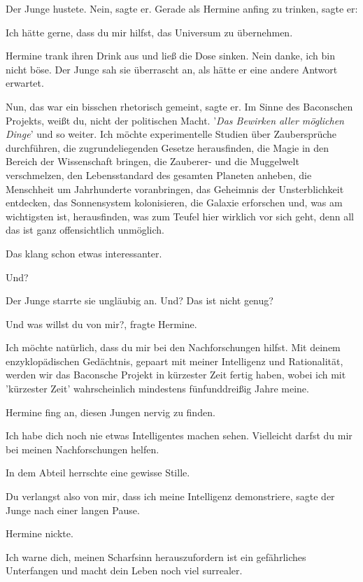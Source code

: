 Der Junge hustete. \glqq{}Nein\grqq{}, sagte er. Gerade als Hermine anfing zu
trinken, sagte er:

\glqq{}Ich hätte gerne, dass du mir hilfst, das Universum zu übernehmen.\grqq{}

Hermine trank ihren Drink aus und ließ die Dose sinken. \glqq{}Nein danke, ich
bin nicht böse.\grqq{} Der Junge sah sie überrascht an, als hätte er eine andere
Antwort erwartet.

\glqq{}Nun, das war ein bisschen rhetorisch gemeint\grqq{}, sagte er. \glqq{}Im
Sinne des Baconschen Projekts, weißt du, nicht der politischen Macht. '\emph{Das
Bewirken aller möglichen Dinge}' und so weiter. Ich möchte experimentelle
Studien über Zaubersprüche durchführen, die zugrundeliegenden Gesetze
herausfinden, die Magie in den Bereich der Wissenschaft bringen, die Zauberer-
und die Muggelwelt verschmelzen, den Lebensstandard des gesamten Planeten
anheben, die Menschheit um Jahrhunderte voranbringen, das Geheimnis der
Unsterblichkeit entdecken, das Sonnensystem kolonisieren, die Galaxie erforschen
und, was am wichtigsten ist, herausfinden, was zum Teufel hier wirklich vor sich
geht, denn all das ist ganz offensichtlich unmöglich.\grqq{}

Das klang schon etwas interessanter.

\glqq{}Und?\grqq{}

Der Junge starrte sie ungläubig an. \glqq{}Und? Das ist nicht genug?\grqq{}

\glqq{}Und was willst du von mir?\grqq{}, fragte Hermine.

\glqq{}Ich möchte natürlich, dass du mir bei den Nachforschungen hilfst. Mit
deinem enzyklopädischen Gedächtnis, gepaart mit meiner Intelligenz und
Rationalität, werden wir das Baconsche Projekt in kürzester Zeit fertig haben,
wobei ich mit 'kürzester Zeit' wahrscheinlich mindestens fünfunddreißig Jahre
meine.\grqq{}

Hermine fing an, diesen Jungen nervig zu finden.

\glqq{}Ich habe dich noch nie etwas Intelligentes machen sehen. Vielleicht darfst
du mir bei meinen Nachforschungen helfen.\grqq{}

In dem Abteil herrschte eine gewisse Stille.

\glqq{}Du verlangst also von mir, dass ich meine Intelligenz demonstriere\grqq{},
sagte der Junge nach einer langen Pause.

Hermine nickte.

\glqq{}Ich warne dich, meinen Scharfsinn herauszufordern ist ein gefährliches
Unterfangen und macht dein Leben noch viel surrealer.\grqq{}

